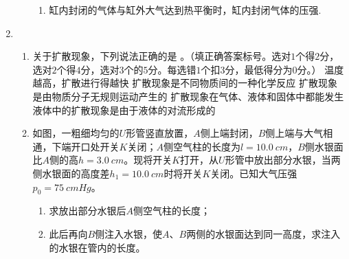\begin{enumerate}[leftmargin=0em]
\begin{enumerate}
\begin{enumerate}
\item 
缸内封闭的气体与缸外大气达到热平衡时，缸内封闭气体的压强.



\end{enumerate}
\begin{figure}[h!]
\flushright

\end{figure}





\end{enumerate}


\newpage
\item 
{}
\begin{enumerate}
\renewcommand{\labelenumi}{\arabic{enumi}.}
\item
关于扩散现象，下列说法正确的是  
。（填正确答案标号。选对$ 1 $个得$ 2 $分，选对$ 2 $个得$ 4 $分，选对$ 3 $个的$ 5 $分。每选错$ 1 $个扣$ 3 $分，最低得分为$ 0 $分。）
\fivechoices
{温度越高，扩散进行得越快}
{扩散现象是不同物质间的一种化学反应}
{扩散现象是由物质分子无规则运动产生的}
{扩散现象在气体、液体和固体中都能发生}
{液体中的扩散现象是由于液体的对流形成的}

\item 
如图，一粗细均匀的$ U $形管竖直放置，$ A $侧上端封闭，$ B $侧上端与大气相通，下端开口处开关$ K $关闭；$ A $侧空气柱的长度为$ l=10.0 \ cm $，$ B $侧水银面比$ A $侧的高$ h=3.0 \ cm $。现将开关$ K $打开，从$ U $形管中放出部分水银，当两侧水银面的高度差$ h_1=10.0 \ cm $时将开关$ K $关闭。已知大气压强$ p_0=75 \ cmHg $。
\begin{enumerate}
\renewcommand{\labelenumi}{\arabic{enumi}.}
\item
求放出部分水银后$ A $侧空气柱的长度；
\item 
此后再向$ B $侧注入水银，使$ A $、$ B $两侧的水银面达到同一高度，求注入的水银在管内的长度。




\end{enumerate}
\end{enumerate}
\end{enumerate}
